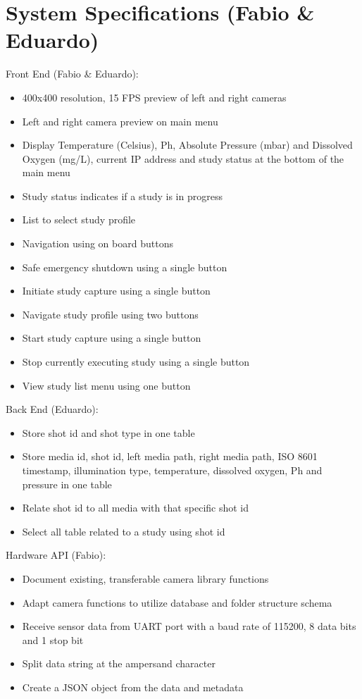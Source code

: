 \section{System Specifications (Fabio \& Eduardo)}
Front End (Fabio \& Eduardo):
\begin{itemize}
	\item 400x400 resolution, 15 FPS preview of left and right cameras
	\item Left and right camera preview on main menu
	\item Display Temperature (Celsius), Ph, Absolute Pressure (mbar) and Dissolved Oxygen (mg/L), current IP address and study status at the bottom of the main menu
	\item Study status indicates if a study is in progress
	\item List to select study profile
	\item Navigation using on board buttons
	\item Safe emergency shutdown using a single button
	\item Initiate study capture using a single button
	\item Navigate study profile using two buttons
	\item Start study capture using a single button
	\item Stop currently executing study using a single button
	\item View study list menu using one button
\end{itemize}
Back End (Eduardo):
\begin{itemize}
	\item Store shot id and shot type in one table
	\item Store media id, shot id, left media path, right media path, ISO 8601 timestamp, illumination type, temperature, dissolved oxygen, Ph and pressure in one table
	\item Relate shot id to all media with that specific shot id
	\item Select all table related to a study using shot id
\end{itemize}
Hardware API (Fabio):
\begin{itemize}
	\item Document existing, transferable camera library functions
	\item Adapt camera functions to utilize database and folder structure schema
	\item Receive sensor data from UART port with a baud rate of 115200, 8 data bits and 1 stop bit
	\item Split data string at the ampersand character
	\item Create a JSON object from the data and metadata
\end{itemize}
